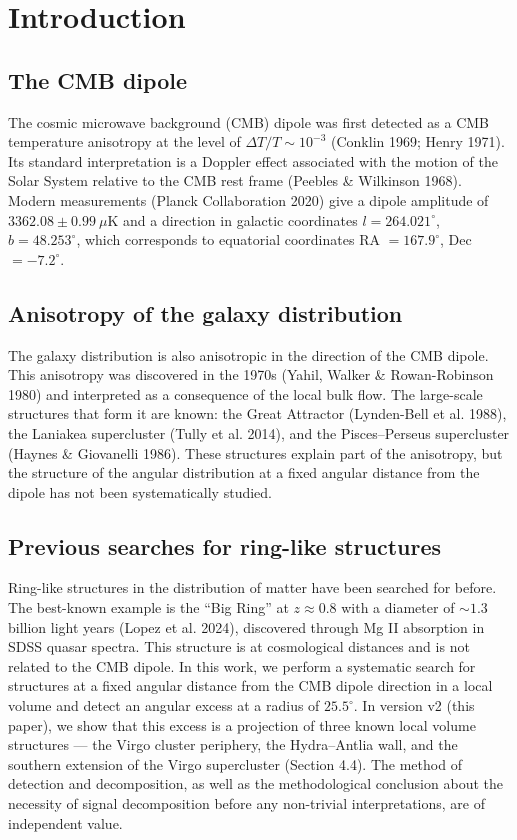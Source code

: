 \documentclass[11pt,a4paper]{article}
\begin{document}
\section{Introduction}
\subsection{The CMB dipole}
The cosmic microwave background (CMB) dipole was first detected as a CMB temperature anisotropy at the level of \(\Delta T/T \sim 10^{-3}\) (Conklin 1969; Henry 1971). Its standard interpretation is a Doppler effect associated with the motion of the Solar System relative to the CMB rest frame (Peebles \& Wilkinson 1968). Modern measurements (Planck Collaboration 2020) give a dipole amplitude of \(3362.08 \pm 0.99\ \mu\)K and a direction in galactic coordinates \(l = 264.021^\circ\), \(b = 48.253^\circ\), which corresponds to equatorial coordinates RA \(= 167.9^\circ\), Dec \(= -7.2^\circ\).

\subsection{Anisotropy of the galaxy distribution}
The galaxy distribution is also anisotropic in the direction of the CMB dipole. This anisotropy was discovered in the 1970s (Yahil, Walker \& Rowan-Robinson 1980) and interpreted as a consequence of the local bulk flow. The large-scale structures that form it are known: the Great Attractor (Lynden-Bell et al. 1988), the Laniakea supercluster (Tully et al. 2014), and the Pisces--Perseus supercluster (Haynes \& Giovanelli 1986). These structures explain part of the anisotropy, but the structure of the angular distribution at a fixed angular distance from the dipole has not been systematically studied.

\subsection{Previous searches for ring-like structures}
Ring-like structures in the distribution of matter have been searched for before. The best-known example is the ``Big Ring'' at \(z \approx 0.8\) with a diameter of \(\sim 1.3\) billion light years (Lopez et al. 2024), discovered through Mg II absorption in SDSS quasar spectra. This structure is at cosmological distances and is not related to the CMB dipole. In this work, we perform a systematic search for structures at a fixed angular distance from the CMB dipole direction in a local volume and detect an angular excess at a radius of \(25.5^\circ\). In version v2 (this paper), we show that this excess is a projection of three known local volume structures --- the Virgo cluster periphery, the Hydra--Antlia wall, and the southern extension of the Virgo supercluster (Section 4.4). The method of detection and decomposition, as well as the methodological conclusion about the necessity of signal decomposition before any non-trivial interpretations, are of independent value.
\end{document}
